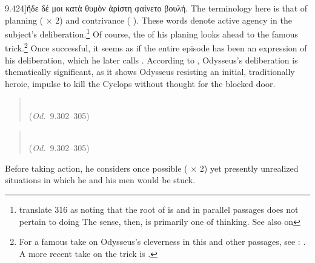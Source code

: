 \documentclass[12pt,letterpaper,oneside,final]{memoir}
\begin{document}
9.424]{\textgreek{ἥδε δέ μοι κατὰ θυμὸν ἀρίστη φαίνετο βουλή}}. The terminology here is that of planning (   $\times$ 2) and contrivance (   ). These words denote active agency in the subject's deliberation.\footnote{\textcite[30]{heubeck1989} translate 316 as  noting that the root of  is  and in parallel passages does not pertain to doing  The sense, then, is primarily one of thinking. See also \textcite[35]{heubeck1989} on  } Of course, the  of his planing looks ahead to the famous  trick.\footnote{For a famous take on Odysseus's cleverness in this and other passages, see \textcite[][35--62]{horkheimeradorno2002}: . A more recent take on the  trick is \textcite[322--323]{slatkin2005}.} Once successful, it seems as if the entire episode has been an expression of his deliberation, which he later calls . According to \textcite[79--79]{schein1970}, Odysseus's deliberation is thematically significant, as it shows Odysseus resisting an initial, traditionally heroic, impulse to kill the Cyclops without thought for the blocked door. \begin{verse}\SingleSpacing \textgreek{\hspace{3.5cm} } \\ (\emph{Od.}~9.302--305)\end{verse} \begin{verse} \SingleSpacing \hspace{3.5cm}  \\ (\emph{Od.}~9.302--305)\end{verse} Before taking action, he considers once possible ( $\times$ 2) yet presently unrealized situations in which he and his men would be stuck. 
\end{document}
